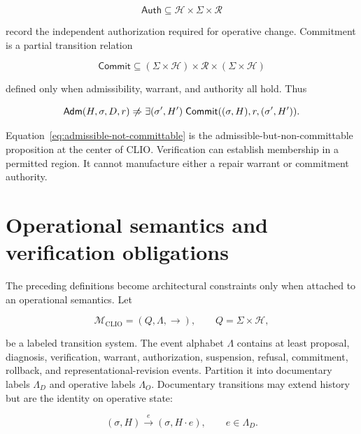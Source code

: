 \documentclass[11pt]{article}
\begin{document}
\begin{equation}
\mathsf{Auth}\subseteq
\mathcal H\times\Sigma\times\mathcal R
\end{equation}

record the independent authorization required for operative change. Commitment is a partial transition relation

\begin{equation}
\mathsf{Commit}\subseteq
(\Sigma\times\mathcal H)\times\mathcal R
\times(\Sigma\times\mathcal H)
\end{equation}

defined only when admissibility, warrant, and authority all hold. Thus

\begin{equation}
\mathsf{Adm}(H,\sigma,D,r)
\centernot\Rightarrow
\exists(\sigma',H')\;
\mathsf{Commit}((\sigma,H),r,(\sigma',H')).
\label{eq:admissible-not-committable}
\end{equation}

Equation~\eqref{eq:admissible-not-committable} is the admissible-but-non-committable proposition at the center of CLIO. Verification can establish membership in a permitted region. It cannot manufacture either a repair warrant or commitment authority.

\section{Operational semantics and verification obligations}

The preceding definitions become architectural constraints only when attached to an operational semantics. Let

\begin{equation}
\mathcal M_{\mathrm{CLIO}}
=
(Q,\Lambda,\longrightarrow),
\qquad
Q=\Sigma\times\mathcal H,
\end{equation}

be a labeled transition system. The event alphabet $\Lambda$ contains at least proposal, diagnosis, verification, warrant, authorization, suspension, refusal, commitment, rollback, and representational-revision events. Partition it into documentary labels $\Lambda_D$ and operative labels $\Lambda_O$. Documentary transitions may extend history but are the identity on operative state:

\begin{equation}
(\sigma,H)\xrightarrow{e}(\sigma,H\cdot e),
\qquad e\in\Lambda_D.
\label{eq:documentary-transition}
\end{equation}
\end{document}
